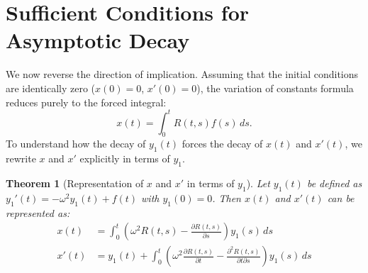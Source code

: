 \documentclass[10pt,reqno]{amsart}
\newtheorem{theorem}{Theorem}
\theoremstyle{definition}
\begin{document}
	\section{Sufficient Conditions for Asymptotic Decay}
	
	We now reverse the direction of implication. Assuming that the initial conditions are identically zero ($x(0)=0$, $x'(0)=0$), the variation of constants formula reduces purely to the forced integral:
	\[ x(t) = \int_0^t R(t, s)f(s) \, ds. \]
	To understand how the decay of $y_1(t)$ forces the decay of $x(t)$ and $x'(t)$, we rewrite $x$ and $x'$ explicitly in terms of $y_1$.
	
	\begin{theorem}[Representation of $x$ and $x'$ in terms of $y_1$]
		Let $y_1(t)$ be defined as $y_1'(t) = -\omega^2 y_1(t) + f(t)$ with $y_1(0) = 0$. Then $x(t)$ and $x'(t)$ can be represented as:
		\begin{align}
			x(t) &= \int_0^t \left( \omega^2 R(t, s) - \frac{\partial R(t, s)}{\partial s} \right) y_1(s) \, ds \label{eq:x_y1} \\
			x'(t) &= y_1(t) + \int_0^t \left( \omega^2 \frac{\partial R(t, s)}{\partial t} - \frac{\partial^2 R(t, s)}{\partial t \partial s} \right) y_1(s) \, ds \label{eq:xp_y1}
		\end{align}
	\end{theorem}
	
\end{document}
